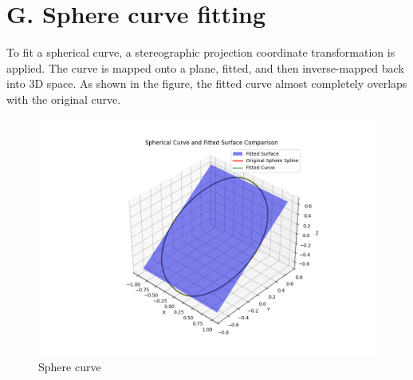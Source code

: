\documentclass[a4paper]{article}
\begin{document}
\section*{G. Sphere curve fitting}

To fit a spherical curve, a stereographic projection coordinate transformation is applied. The curve is mapped onto a plane, fitted, and then inverse-mapped back into 3D space. As shown in the figure, the fitted curve almost completely overlaps with the original curve.
\begin{figure}[h]
    \centering
    \includegraphics[width=0.6\linewidth]{../figure/Sphere.png}
    \caption{Sphere curve}
\end{figure}

\subsection*{  }
\printbibliography
\end{document}
